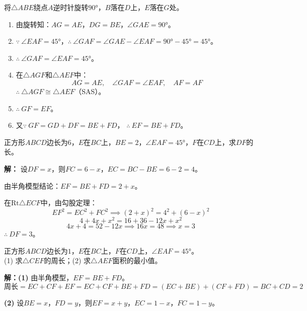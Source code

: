 \documentclass[12pt, a4paper]{ctexart}
\begin{document}
\begin{proofbox}
将$\triangle ABE$绕点$A$逆时针旋转$90°$，$B$落在$D$上，$E$落在$G$处。

\begin{enumerate}[label=\textbf{步骤\arabic*}：]
  \item 由旋转知：$AG = AE$，$DG = BE$，$\angle GAE = 90°$。
  \item $\because\ \angle EAF = 45°$，$\therefore\ \angle GAF = \angle GAE - \angle EAF = 90° - 45° = 45°$。
  \item $\therefore\ \angle GAF = \angle EAF = 45°$。
  \item 在$\triangle AGF$和$\triangle AEF$中：
        \[
        AG = AE,\quad \angle GAF = \angle EAF,\quad AF = AF
        \]
        $\therefore\ \triangle AGF \cong \triangle AEF$（SAS）。
  \item $\therefore\ GF = EF$。
  \item 又$\because\ GF = GD + DF = BE + FD$，
        $\therefore\ \boxed{EF = BE + FD}$。
\end{enumerate}
\end{proofbox}

\begin{examplebox}[【例题1】基础计算]
正方形$ABCD$边长为$6$，$E$在$BC$上，$BE=2$，$\angle EAF=45°$，$F$在$CD$上，求$DF$的长。
\end{examplebox}

\textbf{解：}
设$DF = x$，则$FC = 6 - x$，$EC = BC - BE = 6 - 2 = 4$。

由半角模型结论：$EF = BE + FD = 2 + x$。

在$\mathrm{Rt}\triangle ECF$中，由勾股定理：
\[
EF^2 = EC^2 + FC^2 \implies (2+x)^2 = 4^2 + (6-x)^2
\]
\[
4 + 4x + x^2 = 16 + 36 - 12x + x^2
\]
\[
4x + 4 = 52 - 12x \implies 16x = 48 \implies x = 3
\]
$\therefore\ DF = \boxed{3}$。

\begin{examplebox}[【例题2】周长与面积]
正方形$ABCD$边长为$1$，$E$在$BC$上，$F$在$CD$上，$\angle EAF = 45°$。\\
(1) 求$\triangle CEF$的周长；\quad (2) 求$\triangle AEF$面积的最小值。
\end{examplebox}

\textbf{解：(1)}
由半角模型，$EF = BE + FD$。
\[
\text{周长} = EC + CF + EF = EC + CF + BE + FD = (EC + BE) + (CF + FD) = BC + CD = \boxed{2}
\]

\textbf{(2)}
设$BE = x$，$FD = y$，则$EF = x + y$，$EC = 1-x$，$FC = 1-y$。
\end{document}
